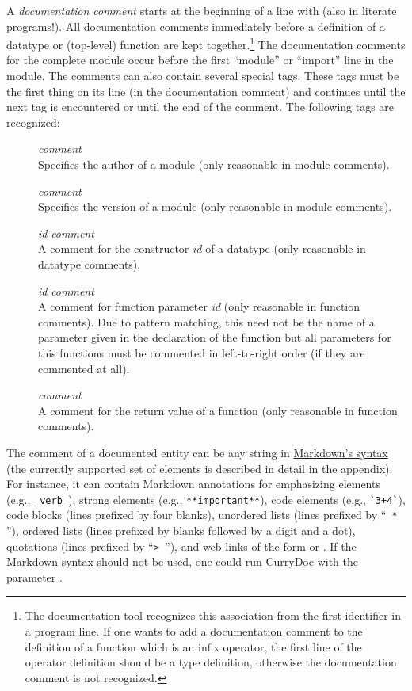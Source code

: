 A \emph{documentation comment}
starts at the beginning of a line
with \ccode{--- }\pindex{---} (also in literate programs!).
All documentation comments immediately before a
definition of a datatype or (top-level) function are kept together.\footnote{%
The documentation tool recognizes this association from the first identifier
in a program line. If one wants to add a documentation comment
to the definition of a function which is an infix operator,
the first line of the operator definition should be a type definition,
otherwise the documentation comment is not recognized.}
The documentation comments for the complete module occur before
the first ``module'' or ``import'' line in the module.
The comments can also contain several special tags. These tags
must be the first thing on its line (in the documentation comment)
and continues until the next tag is encountered or until the
end of the comment. The following tags are recognized:
\begin{description}
\item[] \emph{comment}\\
Specifies the author of a module (only reasonable in module comments).
\item[] \emph{comment}\\
Specifies the version of a module (only reasonable in module comments).
\item[] \emph{id} \emph{comment}\\
A comment for the constructor \emph{id} of a datatype
(only reasonable in datatype comments).
\item[] \emph{id} \emph{comment}\\
A comment for function parameter \emph{id}
(only reasonable in function comments).
Due to pattern matching, this need not be the name of a parameter
given in the declaration of the function but all parameters
for this functions must be commented in left-to-right order
(if they are commented at all).
\item[] \emph{comment}\\
A comment for the return value of a function
(only reasonable in function comments).
\end{description}
The comment of a documented entity can be any string in
\href{http://en.wikipedia.org/wiki/Markdown}{Markdown's syntax}
(the currently supported set of elements
is described in detail in the appendix).
For instance, it can contain Markdown annotations for
emphasizing elements (e.g., \verb!_verb_!),
strong elements (e.g., \verb!**important**!),
code elements (e.g., \verb!`3+4`!), code blocks (lines prefixed by four blanks),
unordered lists (lines prefixed by  ``\verb! * !''),
ordered lists (lines prefixed by blanks followed by a digit and a dot),
quotations (lines prefixed by ``\verb!> !''),
and web links of the form 
or .
If the Markdown syntax should not be used, one could run CurryDoc
with the parameter .

